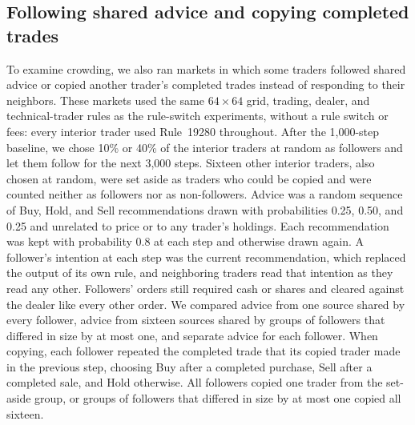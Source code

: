 \subsection{Following shared advice and copying completed trades}

To examine crowding, we also ran markets in which some traders followed
shared advice or copied another trader's completed trades instead of
responding to their neighbors. These markets used the same $64\times64$
grid, trading, dealer, and technical-trader rules as the rule-switch
experiments, without a rule switch or fees: every interior trader used
Rule~19280 throughout. After the 1,000-step baseline, we chose 10\% or
40\% of the interior traders at random as followers and let them follow
for the next 3,000 steps. Sixteen other interior traders, also chosen at
random, were set aside as traders who could be copied and were counted
neither as followers nor as non-followers. Advice was a random sequence
of Buy, Hold, and Sell recommendations drawn with probabilities 0.25,
0.50, and 0.25 and unrelated to price or to any trader's holdings. Each
recommendation was kept with probability 0.8 at each step and otherwise
drawn again. A follower's intention at each step was the current
recommendation, which replaced the output of its own rule, and
neighboring traders read that intention as they read any other.
Followers' orders still required cash or shares and cleared against the
dealer like every other order. We compared advice from one source shared
by every follower, advice from sixteen sources shared by groups of
followers that differed in size by at most one, and separate advice for each follower. When copying, each
follower repeated the completed trade that its copied trader made in the
previous step, choosing Buy after a completed purchase, Sell after a
completed sale, and Hold otherwise. All followers copied one trader from
the set-aside group, or groups of followers that differed in size by at
most one copied all sixteen.

